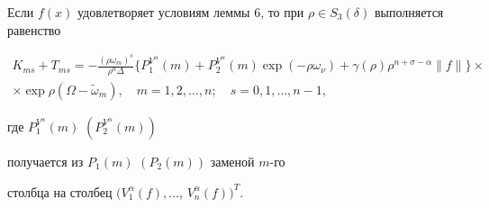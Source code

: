 \begin{lem}


Если $f(x)$ удовлетворяет условиям леммы $6$, то при $\rho\in S_3


(\delta)$ выполняется равенство


\begin{multline*}


K_{ms}+T_{ms}=- \frac {(\rho\omega_m)^s}{\rho^n


\Delta}\{P_1^{V^\alpha}(m)+P_2^{V^\alpha}(m)\exp(-\rho\omega_\nu)


+\gamma(\rho)\rho^{n+\sigma-\alpha}\|f\|\}\times \\


%


\times\exp\rho(\Omega-\widetilde\omega_m),\quad m=1,2,\dotsc,n;\quad


s=0,1,\dotsc,n-1,


\end{multline*}


где $P_1^{V^\alpha}(m)$ $(P_2^{V^\alpha}(m))$


получается из $P_1(m)$ $(P_2(m))$ заменой $m$-го


столбца на столбец $(V_1^\alpha(f),\dotsc$, $V_n^\alpha(f))^T$.


\end{lem}





